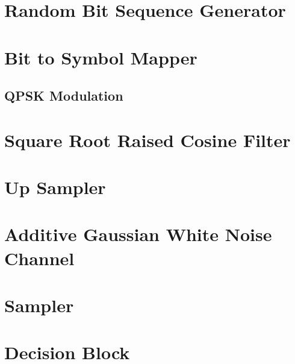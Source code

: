 \documentclass[]{article}
\begin{document}
\appendix
\newpage


\newpage
%


\section{Random Bit Sequence Generator}
\label{app:random_bit_generator}


\section{Bit to Symbol Mapper}
\label{app:bittosym}

\subsection{QPSK Modulation}
\label{app:qpsk_mod}


\section{Square Root Raised Cosine Filter}
\label{app:sqrt_raised_cosine}


\section{Up Sampler}
\label{app:impulse_train}


\section{Additive Gaussian White Noise Channel}
\label{app:awgn_channel}


\section{Sampler}
\label{app:sampler}


\section{Decision Block}
\label{app:dblocks}
\end{document}
